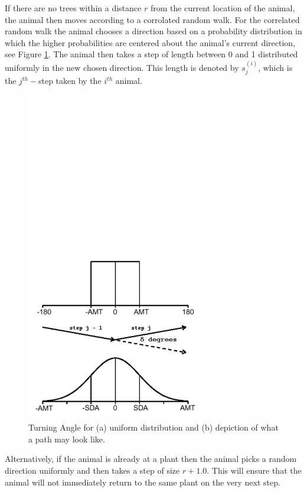   If there are no trees within a distance $r$ from the current location of the animal, the animal then
  moves according to a corrolated random walk.  For the correlated random walk the animal chooses a
  direction based on a probability distribution in which the higher probabilities are centered about
  the animal's current direction, see Figure \ref{TurningAngle}.  The animal then takes a step of
  length between 0 and 1 distributed uniformly in the new chosen direction.  This length is denoted by
  $s_j^{(i)}$, which is the $j^{th}-$step taken by the $i^{th}$ animal.
  \begin{figure}[H]\label{TurningAngle}
    \begin{center}
    \includegraphics[width=1.0\textwidth]{TADistribution.pdf}
    \end{center}
    \caption{Turning Angle for (a) uniform distribution and (b) depiction
    of what a path may look like.}
  \end{figure}
  Alternatively, if the animal is already at a plant then the animal picks a random direction
  uniformly and then takes a step of size $r+1.0$.  This will ensure that the animal will not
  immediately return to the same plant on the very next step.

